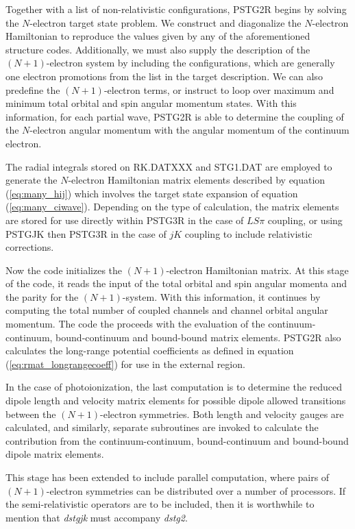Together with a list of non-relativistic configurations, PSTG2R begins by solving the $N$-electron target state problem. We construct and diagonalize the $N$-electron Hamiltonian to reproduce the values given by any of the aforementioned structure codes. Additionally, we must also supply the description of the $(N+1)$-electron system by including the configurations, which are generally one electron promotions from the list in the target description. We can also predefine the $(N+1)$-electron terms, or instruct to loop over maximum and minimum total orbital and spin angular momentum states. With this information, for each partial wave, PSTG2R is able to determine the coupling of the $N$-electron angular momentum with the angular momentum of the continuum electron.

The radial integrals stored on RK.DATXXX and STG1.DAT are employed to generate the $N$-electron Hamiltonian matrix elements described by equation (\ref{eq:many_hij}) which involves the target state expansion of equation (\ref{eq:many_ciwave}). Depending on the type of calculation, the matrix elements are stored for use directly within PSTG3R in the case of $LS\pi$ coupling, or using PSTGJK then PSTG3R in the case of $jK$ coupling to include relativistic corrections.

Now the code initializes the $(N+1)$-electron Hamiltonian matrix. At this stage of the code, it reads the input of the total orbital and spin angular momenta and the parity for the $(N+1)$-system. With this information, it continues by computing the total number of coupled channels and channel orbital angular momentum. The code the proceeds with the evaluation of the continuum-continuum, bound-continuum and bound-bound matrix elements. PSTG2R also calculates the long-range potential coefficients as defined in equation (\ref{eq:rmat_longrangecoeff}) for use in the external region.

In the case of photoionization, the last computation is to determine the reduced dipole length and velocity matrix elements for possible dipole allowed transitions between the $(N+1)$-electron symmetries. Both length and velocity gauges are calculated, and similarly, separate subroutines are invoked to calculate the contribution from the continuum-continuum, bound-continuum and bound-bound dipole matrix elements.

This stage has been extended to include parallel computation, where pairs of $(N+1)$-electron symmetries can be distributed over a number of processors. If the semi-relativistic operators are to be included, then it is worthwhile to mention that \textit{dstgjk} must accompany \textit{dstg2}.

